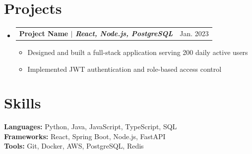 \documentclass[letterpaper,11pt]{article}
\makeatletter
\newcommand{\resumeItem}[1]{
  \item\small{#1 \vspace{-1pt}}
}
\newcommand{\resumeProjectHeading}[2]{
  \item
    \begin{tabular*}{\textwidth}{l@{\extracolsep{\fill}}r}
      \textbf{\color{textbase}#1} & {\color{midgray}\small #2} \\
    \end{tabular*}\vspace{-4pt}
}
\newcommand{\resumeSubHeadingListStart}{\begin{itemize}[leftmargin=0in,label={}]}
\newcommand{\resumeSubHeadingListEnd}{\end{itemize}}
\newcommand{\resumeItemListStart}{\begin{itemize}[leftmargin=0.15in,label={\color{tealprimary}\small\textbullet}]}
\newcommand{\resumeItemListEnd}{\end{itemize}\vspace{0pt}}
\makeatother
\begin{document}
\section{Projects}
\resumeSubHeadingListStart

\resumeProjectHeading
{\textbf{Project Name} $|$ \textit{React, Node.js, PostgreSQL}}{Jan. 2023}
\resumeItemListStart
\resumeItem{Designed and built a full-stack application serving 200 daily active users}
\resumeItem{Implemented JWT authentication and role-based access control}
\resumeItemListEnd

\resumeSubHeadingListEnd

\section{Skills}
\begin{itemize}[leftmargin=0in,label={}]
  \small{\item{
    \textbf{Languages:} Python, Java, JavaScript, TypeScript, SQL \\
    \textbf{Frameworks:} React, Spring Boot, Node.js, FastAPI \\
    \textbf{Tools:} Git, Docker, AWS, PostgreSQL, Redis
  }}
\end{itemize}
\end{document}

